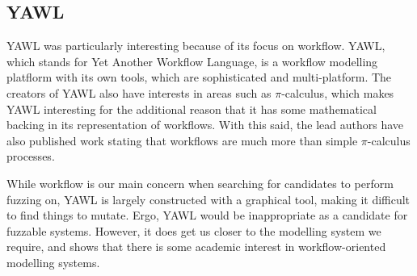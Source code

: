 \subsection{YAWL} %
YAWL was particularly interesting because of its focus on workflow. YAWL, which stands for Yet Another Workflow Language\cite{TerHofstede2010}, is a workflow modelling platflorm with its own tools, which are sophisticated and multi-platform. The creators of YAWL also have interests in areas such as \(\pi\)-calculus\cite{Aalst2004}, which makes YAWL interesting for the additional reason that it has some mathematical backing in its representation of workflows. With this said, the lead authors have also published work stating that workflows are much more than simple \(\pi\)-calculus processes\cite{Aalst2004}. \par
While workflow is our main concern when searching for candidates to perform fuzzing on, YAWL is largely constructed with a graphical tool, making it difficult to find things to mutate. Ergo, YAWL would be inappropriate as a candidate for fuzzable systems. However, it does get us closer to the modelling system we require, and shows that there is some academic interest in workflow-oriented modelling systems. \par

